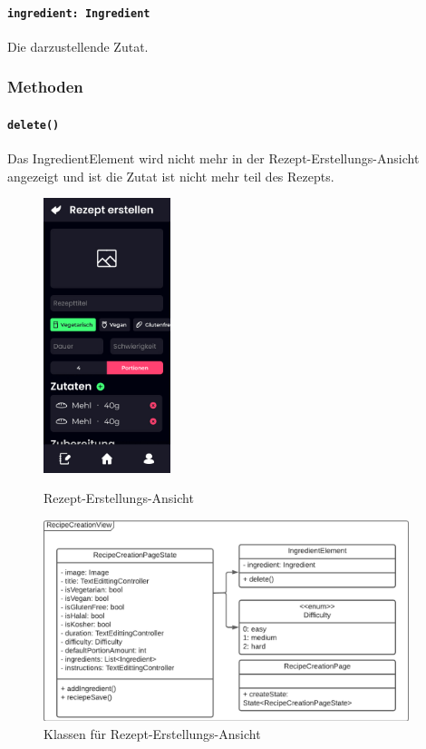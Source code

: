 \documentclass[parskip=full]{scrartcl}
\begin{document}
                \paragraph*{\texttt{ingredient: Ingredient}} Die darzustellende Zutat.

            \subsubsection*{Methoden}
                \paragraph*{\texttt{delete()}} Das IngredientElement wird nicht mehr in der Rezept-Erstellungs-Ansicht angezeigt und ist die Zutat ist nicht mehr teil des Rezepts.

        \begin{figure}[htp]
                \begin{minipage}
                    [t]{0.49\textwidth}
                    \centering
                    \includegraphics[height=80mm]{images/Presentation-layer/RecipeCreationView.jpg}
                    \caption{Rezept-Erstellungs-Ansicht}
                \end{minipage}
                \begin{minipage}
                    [t]{0.49\textwidth}
                    \centering
                    \includegraphics[width=0.95\textwidth]{images/Presentation-layer/RecipeCreationViewClass.pdf}
                    \caption{Klassen für Rezept-Erstellungs-Ansicht}
                \end{minipage}
        \end{figure}
\end{document}
